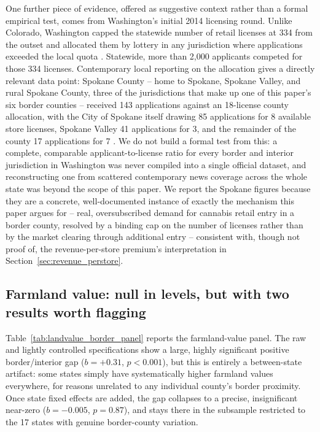 ﻿\documentclass{article}
\begin{document}
One further piece of evidence, offered as suggestive context rather than a formal empirical test, comes
from Washington's initial 2014 licensing round. Unlike Colorado, Washington capped the statewide number of
retail licenses at 334 from the outset and allocated them by lottery in any jurisdiction where applications
exceeded the local quota \citep{WSLCB2014LotteryPR}. Statewide, more than 2,000 applicants competed for
those 334 licenses. Contemporary local reporting on the allocation gives a directly relevant data point:
Spokane County -- home to Spokane, Spokane Valley, and rural Spokane County, three of the jurisdictions
that make up one of this paper's six border counties -- received 143 applications against an 18-license
county allocation, with the City of Spokane itself drawing 85 applications for 8 available store licenses,
Spokane Valley 41 applications for 3, and the remainder of the county 17 applications for 7
\citep{SpokesmanReview2014Lottery}. We do not build a formal test from this: a complete, comparable
applicant-to-license ratio for every border and interior jurisdiction in Washington was never compiled into
a single official dataset, and reconstructing one from scattered contemporary news coverage across the
whole state was beyond the scope of this paper. We report the Spokane figures because they are a
concrete, well-documented instance of exactly the mechanism this paper argues for -- real, oversubscribed
demand for cannabis retail entry in a border county, resolved by a binding cap on the number of licenses
rather than by the market clearing through additional entry -- consistent with, though not proof of, the
revenue-per-store premium's interpretation in Section~\ref{sec:revenue_perstore}.

\subsection{Farmland value: null in levels, but with two results worth flagging}
\label{sec:landvalue_marketage}

Table~\ref{tab:landvalue_border_panel} reports the farmland-value panel. The raw and lightly controlled
specifications show a large, highly significant positive border/interior gap ($b=+0.31$, $p<0.001$), but
this is entirely a between-state artifact: some states simply have systematically higher farmland values
everywhere, for reasons unrelated to any individual county's border proximity. Once state fixed effects
are added, the gap collapses to a precise, insignificant near-zero ($b=-0.005$, $p=0.87$), and stays there
in the subsample restricted to the 17 states with genuine border-county variation.
\end{document}
